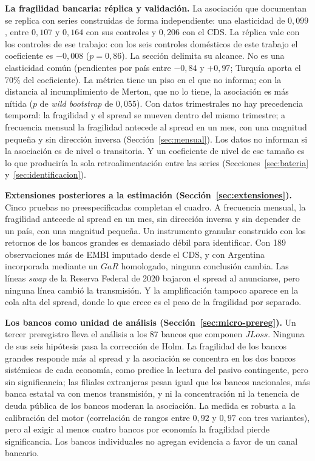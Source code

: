 \textbf{La fragilidad bancaria: réplica y validación.} La asociación que documentan \citet{Chari2024b} se replica con series construidas de forma independiente: una elasticidad de $0{,}099$, entre $0{,}107$ y $0{,}164$ con sus controles y $0{,}206$ con el CDS. La réplica vale con los controles de ese trabajo: con los seis controles domésticos de este trabajo el coeficiente es $-0{,}008$ ($p=0{,}86$). La sección delimita su alcance. No es una elasticidad común (pendientes por país entre $-0{,}84$ y $+0{,}97$; Turquía aporta el 70\% del coeficiente). La métrica tiene un piso en el que no informa; con la distancia al incumplimiento de Merton, que no lo tiene, la asociación es más nítida ($p$ de \textit{wild bootstrap} de $0{,}055$). Con datos trimestrales no hay precedencia temporal: la fragilidad y el spread se mueven dentro del mismo trimestre; a frecuencia mensual la fragilidad antecede al spread en un mes, con una magnitud pequeña y sin dirección inversa (Sección~\ref{sec:mensual}). Los datos no informan si la asociación es de nivel o transitoria. Y un coeficiente de nivel de ese tamaño es lo que produciría la sola retroalimentación entre las series (Secciones~\ref{sec:bateria} y~\ref{sec:identificacion}).

\textbf{Extensiones posteriores a la estimación (Sección~\ref{sec:extensiones}).} Cinco pruebas no preespecificadas completan el cuadro. A frecuencia mensual, la fragilidad antecede al spread en un mes, sin dirección inversa y sin depender de un país, con una magnitud pequeña. Un instrumento granular construido con los retornos de los bancos grandes es demasiado débil para identificar. Con 189 observaciones más de EMBI imputado desde el CDS, y con Argentina incorporada mediante un $GaR$ homologado, ninguna conclusión cambia. Las líneas \textit{swap} de la Reserva Federal de 2020 bajaron el spread al anunciarse, pero ninguna línea cambió la transmisión. Y la amplificación tampoco aparece en la cola alta del spread, donde lo que crece es el peso de la fragilidad por separado.

\textbf{Los bancos como unidad de análisis (Sección~\ref{sec:micro-prereg}).} Un tercer preregistro lleva el análisis a los 87 bancos que componen $JLoss$. Ninguna de sus seis hipótesis pasa la corrección de Holm. La fragilidad de los bancos grandes responde más al spread y la asociación se concentra en los dos bancos sistémicos de cada economía, como predice la lectura del pasivo contingente, pero sin significancia; las filiales extranjeras pesan igual que los bancos nacionales, más banca estatal va con menos transmisión, y ni la concentración ni la tenencia de deuda pública de los bancos moderan la asociación. La medida es robusta a la calibración del motor (correlación de rangos entre $0{,}92$ y $0{,}97$ con tres variantes), pero al exigir al menos cuatro bancos por economía la fragilidad pierde significancia. Los bancos individuales no agregan evidencia a favor de un canal bancario.

